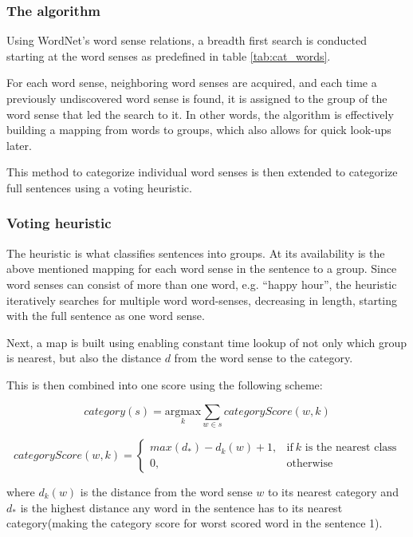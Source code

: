 \documentclass[a4paper,11pt]{kth-mag}
\begin{document}
\subsubsection{The algorithm}
Using WordNet's \cite{wordnet} word sense relations, a  breadth first search is conducted
starting at the word senses as predefined in table \ref{tab:cat_words}.

For each word sense, neighboring word senses are acquired, and each time a previously undiscovered word sense
is found, it is assigned to the group of the word sense that led the search to it. In other words, the algorithm
is effectively building a mapping from words to groups, which also allows for quick look-ups later.

This method to categorize individual word senses is then extended to categorize full sentences using
a voting heuristic.

\subsubsection{Voting heuristic}
The heuristic is what classifies sentences into groups.
At its availability is the above mentioned mapping for each word sense in the sentence to a group.
Since word senses can consist of more than one word,
e.g. ``happy hour'', the heuristic iteratively searches for multiple word word-senses,
decreasing in length, starting with the full sentence as one word sense.

Next, a map is built using enabling constant time lookup of not only which group is nearest,
but also the distance $d$ from the word sense to the category.

This is then combined into one score using the following scheme:

\begin{equation} \label{eq:heruistic}
  category(s) =
  \underset{k}{\text{argmax}}
  \sum_{w \in s} categoryScore(w, k)
\end{equation}

\begin{equation} \label{eq:heruistic_d}
  categoryScore(w, k) =
  \begin{cases}
    max(d_*) - d_k(w) + 1, & \text{if}\ k \text{ is the nearest class}\\
    0, & \text{otherwise}
  \end{cases}
\end{equation}

where $d_k(w)$ is the distance from the word sense $w$
to its nearest category and $d_*$ is the highest distance any word in the sentence
has to its nearest category(making the category score for worst scored word in the sentence 1).
\end{document}

